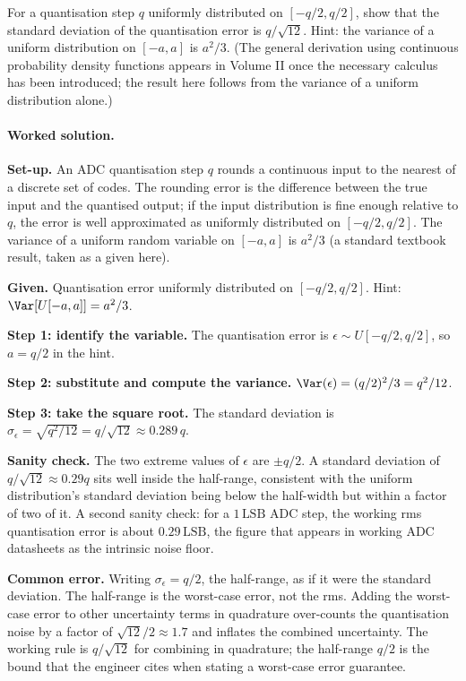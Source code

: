 \begin{exercise}
For a quantisation step $q$ uniformly distributed on
$[-q/2, q/2]$, show that the standard deviation of the quantisation
error is $q/\sqrt{12}$. Hint: the variance of a uniform
distribution on $[-a, a]$ is $a^{2}/3$. (The general derivation
using continuous probability density functions appears in Volume II
once the necessary calculus has been introduced; the result here
follows from the variance of a uniform distribution alone.)

\paragraph{Worked solution.}
\textbf{Set-up.} An ADC quantisation step $q$ rounds a continuous
input to the nearest of a discrete set of codes. The rounding
error is the difference between the true input and the quantised
output; if the input distribution is fine enough relative to $q$,
the error is well approximated as uniformly distributed on
$[-q/2, q/2]$. The variance of a uniform random variable on
$[-a, a]$ is $a^{2}/3$ (a standard textbook result, taken as a
given here).

\textbf{Given.} Quantisation error uniformly distributed on
$[-q/2, q/2]$. Hint: $\Var[U[-a, a]] = a^{2}/3$.

\textbf{Step 1: identify the variable.} The quantisation error is
$\epsilon \sim U[-q/2, q/2]$, so $a = q/2$ in the hint.

\textbf{Step 2: substitute and compute the variance.}
$\Var(\epsilon) = (q/2)^{2}/3 = q^{2}/12$.

\textbf{Step 3: take the square root.} The standard deviation is
$\sigma_{\epsilon} = \sqrt{q^{2}/12} = q/\sqrt{12} \approx 0.289
\, q$.

\textbf{Sanity check.} The two extreme values of $\epsilon$ are
$\pm q/2$. A standard deviation of $q/\sqrt{12} \approx 0.29 q$
sits well inside the half-range, consistent with the uniform
distribution's standard deviation being below the half-width but
within a factor of two of it. A second sanity check: for a $1
\,\text{LSB}$ ADC step, the working rms quantisation error is
about $0.29 \,\text{LSB}$, the figure that appears in working
ADC datasheets as the intrinsic noise floor.

\textbf{Common error.} Writing $\sigma_{\epsilon} = q/2$, the
half-range, as if it were the standard deviation. The half-range
is the worst-case error, not the rms. Adding the worst-case error
to other uncertainty terms in quadrature over-counts the
quantisation noise by a factor of $\sqrt{12}/2 \approx 1.7$ and
inflates the combined uncertainty. The working rule is
$q/\sqrt{12}$ for combining in quadrature; the half-range $q/2$
is the bound that the engineer cites when stating a worst-case
error guarantee.
\end{exercise}

